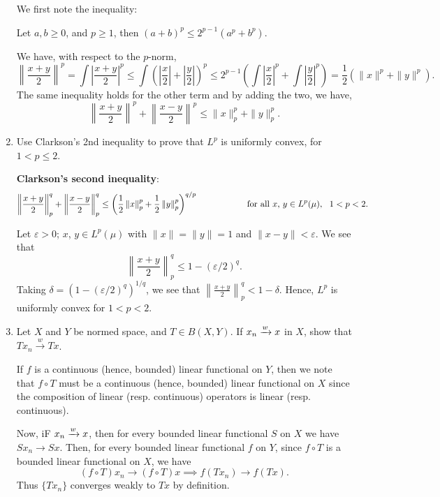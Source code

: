 \documentclass[12pt]{article}
\begin{document}
\begin{enumerate}
\begin{mybox}
        We first note the inequality:

        Let $a, b \geq 0$, and $p \geq 1$, then
        $(a+b)^p \leq 2^{p-1} (a^p + b^p).$

        \vspace*{2mm}
        We have, with respect to the $p$-norm,
        $$\left\|\frac{x+y}{2}\right\|^p=
        \int{\left|\frac{x+y}{2}\right|^p}\leq
        \int{\left(\left|\frac{x}{2}\right|+
        \left|\frac{y}{2}\right|\right)^p}
        \leq 2^{p-1}\left(\int{\left|\frac{x}{2}\right|^p}+
        \int{\left|\frac{y}{2}\right|^p}\right)
        =\frac{1}{2}(\|x\|^p+\|y\|^p).$$
        The same inequality holds for the other term and
        by adding the two, we have,
        $$\left\|\frac{x+y}{2}\right\|^p+
        \left\|\frac{x-y}{2}\right\|^p
        \leq \|x\|^p_p+\|y\|^p_p.$$
    \end{mybox}
     
    \item Use Clarkson's 2nd inequality to prove that $L^p$ is uniformly convex, for $1 < p \leq2$.
    \begin{mybox}
        \textbf{Clarkson's second inequality}:
        $$\left\|\frac{x+y}{2}\right\|^q_p+\left\|\frac{x-y}{2}\right\|^q_p\leq
        \left(\frac{1}{2}\left\|x\right\|^p_p+
        \frac{1}{2}\left\|y\right\|^p_p\right)^{q/p}
        \hspace*{20mm}\text{for all $x$, $y\in L^p(\mu)$},\ \ 1< p<2.$$

        Let $\varepsilon>0$; $x$, $y\in L^p(\mu)$ with
        $\|x\|=\|y\|= 1$ and
        $\|x-y\|<\varepsilon$. We see that
        $$\left\|\frac{x+y}{2}\right\|^q_p\leq
        1-(\varepsilon/2)^q.$$
        Taking $\delta=(1-(\varepsilon/2)^q)^{1/q}$,
        we see that $\left\|\frac{x+y}{2}\right\|^q_p
        <1-\delta$. Hence, $L^p$ is uniformly convex for
        $1<p<2$.
    \end{mybox}

    \item  Let $X$ and $Y$ be normed space, and $T \in B(X,Y)$. If $\displaystyle x_n \xrightarrow{w} x$ in $X$, show that $Tx_n \xrightarrow{w} Tx$.
    \begin{mybox}
        If $f$ is a continuous (hence, bounded) linear functional on $Y$, then
        we note that $f\circ T$ must be a continuous
        (hence, bounded) linear functional on $X$ since
        the composition of linear (resp. continuous)
        operators is linear (resp. continuous).
        
        \vspace*{2mm}
        Now, iF $\displaystyle x_n \xrightarrow{w} x$, then for
        every bounded linear functional $S$ on $X$ we have
        $Sx_n \longrightarrow Sx$. Then, for every bounded
        linear functional $f$ on $Y$, since $f\circ T$ is a
        bounded linear functional on $X$, we have
        $$(f\circ T)x_n\longrightarrow (f\circ T)x
        \implies f(Tx_n)\longrightarrow f(Tx).$$
        Thus $\{Tx_n\}$ converges weakly to $Tx$ by definition.
    \end{mybox}
\end{enumerate}
\end{document}
